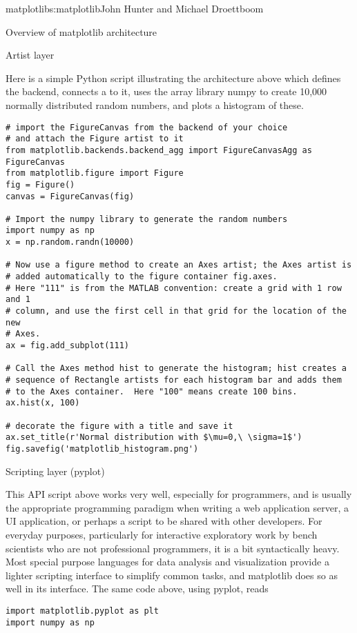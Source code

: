\begin{aosachapter}{matplotlib}{s:matplotlib}{John Hunter and Michael Droettboom}
\begin{aosasect1}{Overview of matplotlib architecture}
\begin{aosasect2}{Artist layer}
\end{aosasect2}

Here is a simple Python script illustrating the architecture above
which defines the backend, connects a  to it, uses the array
library numpy to create 10,000 normally distributed random numbers,
and plots a histogram of these.

\begin{verbatim}
# import the FigureCanvas from the backend of your choice
# and attach the Figure artist to it
from matplotlib.backends.backend_agg import FigureCanvasAgg as FigureCanvas
from matplotlib.figure import Figure
fig = Figure()
canvas = FigureCanvas(fig)

# Import the numpy library to generate the random numbers
import numpy as np
x = np.random.randn(10000)

# Now use a figure method to create an Axes artist; the Axes artist is
# added automatically to the figure container fig.axes.
# Here "111" is from the MATLAB convention: create a grid with 1 row and 1
# column, and use the first cell in that grid for the location of the new
# Axes.
ax = fig.add_subplot(111)

# Call the Axes method hist to generate the histogram; hist creates a
# sequence of Rectangle artists for each histogram bar and adds them
# to the Axes container.  Here "100" means create 100 bins.
ax.hist(x, 100)

# decorate the figure with a title and save it
ax.set_title(r'Normal distribution with $\mu=0,\ \sigma=1$')
fig.savefig('matplotlib_histogram.png')
\end{verbatim}

\begin{aosasect2}{Scripting layer (pyplot)}

  This API script above works very well, especially for programmers,
  and is usually the appropriate programming paradigm when writing a
  web application server, a UI application, or perhaps a script to be
  shared with other developers.  For everyday purposes, particularly
  for interactive exploratory work by bench scientists who are not
  professional programmers, it is a bit syntactically heavy.  Most
  special purpose languages for data analysis and visualization
  provide a lighter scripting interface to simplify common tasks, and
  matplotlib does so as well in its 
  interface.  The same code above, using pyplot, reads

\begin{verbatim}
import matplotlib.pyplot as plt
import numpy as np


\end{verbatim}
\end{aosasect2}
\end{aosasect1}
\end{aosachapter}
